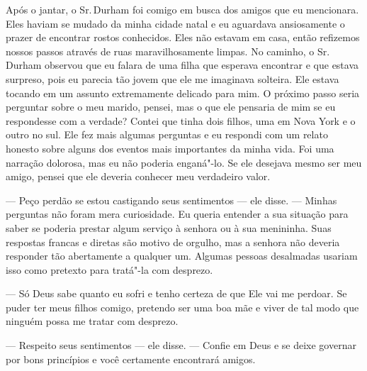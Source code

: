 Após o jantar, o Sr.\,Durham foi comigo
em busca dos amigos que eu mencionara. Eles haviam se mudado da minha
cidade natal e eu aguardava ansiosamente o prazer de encontrar rostos
conhecidos. Eles não estavam em casa, então refizemos nossos passos
através de ruas maravilhosamente limpas. No caminho, o Sr.\,Durham
observou que eu falara de uma filha que esperava encontrar e que estava
surpreso, pois eu parecia tão jovem que ele me imaginava solteira. Ele
estava tocando em um assunto extremamente delicado para mim. O próximo
passo seria perguntar sobre o meu marido, pensei, mas o que ele pensaria
de mim se eu respondesse com a verdade? Contei que tinha dois filhos,
uma em Nova York e o outro no sul. Ele fez mais algumas perguntas e eu
respondi com um relato honesto sobre alguns dos eventos mais importantes
da minha vida. Foi uma narração dolorosa, mas eu não poderia enganá"-lo.
Se ele desejava mesmo ser meu amigo, pensei que ele deveria conhecer meu
verdadeiro valor.

--- Peço perdão se estou castigando seus sentimentos --- ele disse. ---
Minhas perguntas não foram mera curiosidade. Eu queria entender a sua
situação para saber se poderia prestar algum serviço à senhora ou à sua
menininha. Suas respostas francas e diretas são motivo de orgulho, mas a
senhora não deveria responder tão abertamente a qualquer um. Algumas
pessoas desalmadas usariam isso como pretexto para tratá"-la com
desprezo.


--- Só Deus sabe quanto eu sofri e tenho certeza de que Ele vai me
perdoar. Se puder ter meus filhos comigo, pretendo ser uma boa mãe e
viver de tal modo que ninguém possa me tratar com desprezo.

--- Respeito seus sentimentos --- ele
disse. --- Confie em Deus e se deixe governar por bons princípios e você
certamente encontrará amigos.


